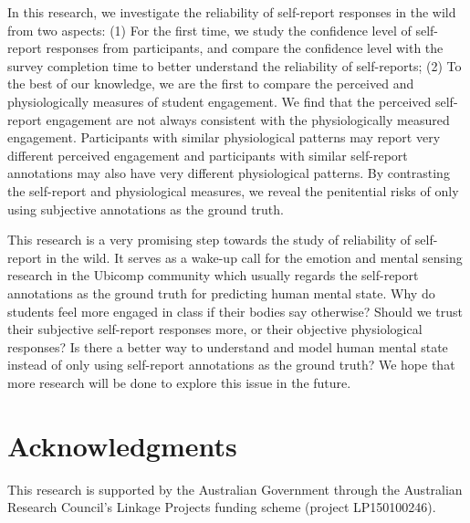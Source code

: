 \documentclass[sigconf]{acmart}
\begin{document}
In this research, we investigate the reliability of self-report responses in the wild from two aspects: (1) For the first time, we study the confidence level of self-report responses from participants, and compare the confidence level with the survey completion time to better understand the reliability of self-reports; (2) To the best of our knowledge, we are the first to compare the perceived and physiologically measures of student engagement. We find that the perceived self-report engagement are not always consistent with the physiologically measured engagement. Participants with similar physiological patterns may report very different perceived engagement and participants with similar self-report annotations may also have very different physiological patterns. By contrasting the self-report and physiological measures, we reveal the penitential risks of only using subjective annotations as the ground truth. %






This research is a very promising step towards the study of reliability of self-report in the wild. It serves as a wake-up call for the emotion and mental sensing research in the Ubicomp community which usually regards the self-report annotations as the ground truth for predicting human mental state. Why do students feel more engaged in class if their bodies say otherwise? Should we trust their subjective self-report responses more, or their objective physiological responses? Is there a better way to understand and model human mental state instead of only using self-report annotations as the ground truth? We hope that more research will be done to explore this issue in the future.



\section{Acknowledgments}

This research is supported by the Australian Government through the Australian Research Council's Linkage Projects funding scheme (project LP150100246).



\end{document}
